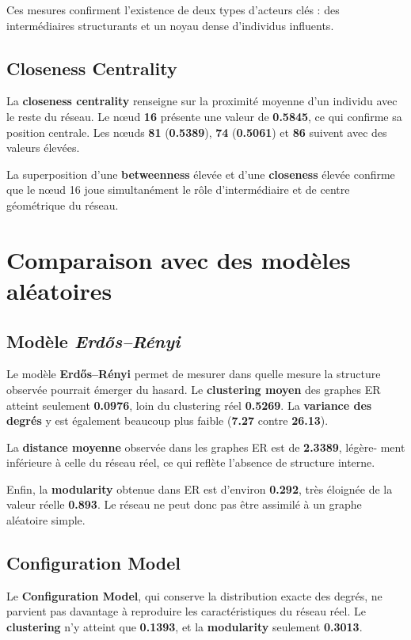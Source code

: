 \documentclass[10pt,twocolumn]{article}
\begin{document}
Ces mesures confirment l’existence de deux types d’acteurs clés : des intermédiaires structurants 
et un noyau dense d’individus influents.

\subsection{Closeness Centrality}

La \textbf{closeness centrality} renseigne sur la proximité moyenne d’un individu avec le reste du réseau. 
Le nœud \textbf{16} présente une valeur de \textbf{0.5845}, ce qui confirme sa position centrale. 
Les nœuds \textbf{81} (\textbf{0.5389}), \textbf{74} (\textbf{0.5061}) et \textbf{86} suivent avec des valeurs élevées.

La superposition d’une \textbf{betweenness} élevée et d’une \textbf{closeness} élevée confirme que le nœud 16 
joue simultanément le rôle d’intermédiaire et de centre géométrique du réseau.

\section{Comparaison avec des modèles aléatoires}

\subsection{Modèle \textit{Erdős–Rényi}}

Le modèle \textbf{Erdős–Rényi} permet de mesurer dans quelle mesure la structure observée pourrait émerger du hasard.  
Le \textbf{clustering moyen} des graphes ER atteint seulement \textbf{0.0976}, loin du clustering réel \textbf{0.5269}.  
La \textbf{variance des degrés} y est également beaucoup plus faible (\textbf{7.27} contre \textbf{26.13}).  

La \textbf{distance moyenne} observée dans les graphes ER est de \textbf{2.3389}, légère- ment inférieure à celle du réseau 
réel, ce qui reflète l’absence de structure interne.  

Enfin, la \textbf{modularity} obtenue dans ER est d’environ \textbf{0.292}, très éloignée de la valeur réelle \textbf{0.893}.  
Le réseau ne peut donc pas être assimilé à un graphe aléatoire simple.

\subsection{Configuration Model}

Le \textbf{Configuration Model}, qui conserve la distribution exacte des degrés, ne parvient pas davantage à reproduire 
les caractéristiques du réseau réel. Le \textbf{clustering} n’y atteint que \textbf{0.1393}, et la \textbf{modularity} seulement 
\textbf{0.3013}.  
\end{document}
